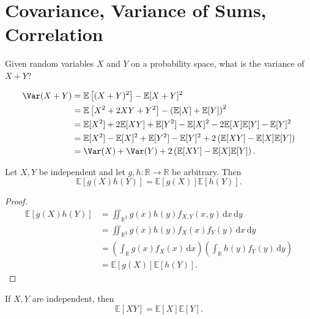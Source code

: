 \section{Covariance, Variance of Sums, Correlation}
\begin{question}
    Given random variables \(X\) and \(Y\) on a probability space, what is the variance of \(X + Y\)?   
\end{question}
\begin{answer}
    \begin{align*}
        \Var(X + Y) &= \mathbb{E} \left[ (X + Y)^2 \right] - \mathbb{E} [X + Y]^2 \\
        &= \mathbb{E} \left[ X^2 + 2 X Y + Y^2 \right] - \left( \mathbb{E} [X] + \mathbb{E}[Y] \right)^2 \\
        &= \mathbb{E} [X^2] + 2 \mathbb{E} [X Y] + \mathbb{E} [Y^2] - \mathbb{E} [X]^2 - 2 \mathbb{E} [X] \mathbb{E} [Y] - \mathbb{E} [Y]^2 \\
        &= \mathbb{E} [X^2] - \mathbb{E} [X]^2 + \mathbb{E} [Y^2] - \mathbb{E} [Y]^2 + 2 \left( \mathbb{E} [X Y] - \mathbb{E} [X] \mathbb{E} [Y] \right) \\
        &= \Var(X) + \Var(Y) + 2 \left( \mathbb{E} [XY] - \mathbb{E} [X] \mathbb{E} [Y] \right).    
    \end{align*}
\end{answer}

\begin{proposition}
    Let \(X, Y\) be independent and let \(g, h : \mathbb{R} \to \mathbb{R} \) be arbitrary. Then 
    \[
        \mathbb{E} [g(X) h(Y)] = \mathbb{E} [g(X)] \mathbb{E} [h(Y)].
    \]  
\end{proposition}

\begin{proof}
    \begin{align*}
        \mathbb{E} [g(X) h(Y)] &= \iint_{\mathbb{R} ^2} g(x) h(y) f_{X, Y} (x, y) \, \mathrm{d} x \, \mathrm{d} y \\
        &= \iint_{\mathbb{R} ^2} g(x) h(y) f_X(x) f_Y(y) \, \mathrm{d} x \, \mathrm{d} y \\
        &= \left( \int _{\mathbb{R} } g(x) f_X(x) \, \mathrm{d} x  \right) \left( \int _{\mathbb{R} } h(y) f_Y(y) \, \mathrm{d} y  \right) \\
        &= \mathbb{E} [g(X)] \mathbb{E} [h(Y)].
    \end{align*}
\end{proof}

\begin{corollary}
    If \(X, Y\) are independent, then 
    \[
        \mathbb{E} [XY] = \mathbb{E} [X] \mathbb{E} [Y].
    \] 
\end{corollary}

